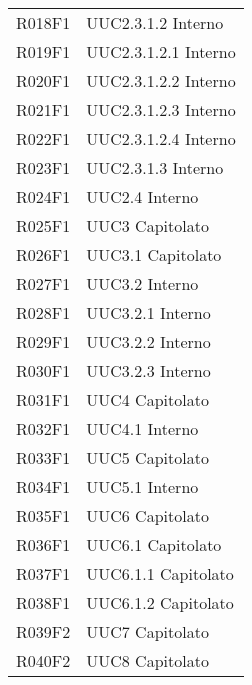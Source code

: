 \documentclass[../analisi-dei-requisiti.tex]{subfiles}
\begin{document}
\begin{longtable}[H]{ p{4cm} | p{4cm} }
  R018F1                               & UUC2.3.1.2 Interno            \\
  R019F1                               & UUC2.3.1.2.1 Interno          \\
  R020F1                               & UUC2.3.1.2.2 Interno          \\
  R021F1                               & UUC2.3.1.2.3 Interno          \\
  R022F1                               & UUC2.3.1.2.4 Interno          \\
  R023F1                               & UUC2.3.1.3 Interno            \\
  R024F1                               & UUC2.4 Interno                \\
  R025F1                               & UUC3 Capitolato               \\
  R026F1                               & UUC3.1 Capitolato             \\
  R027F1                               & UUC3.2 Interno                \\
  R028F1                               & UUC3.2.1 Interno              \\
  R029F1                               & UUC3.2.2 Interno              \\
  R030F1                               & UUC3.2.3 Interno              \\
  R031F1                               & UUC4 Capitolato               \\
  R032F1                               & UUC4.1 Interno                \\
  R033F1                               & UUC5 Capitolato               \\
  R034F1                               & UUC5.1 Interno                \\
  R035F1                               & UUC6 Capitolato               \\
  R036F1                               & UUC6.1 Capitolato             \\
  R037F1                               & UUC6.1.1 Capitolato           \\
  R038F1                               & UUC6.1.2 Capitolato           \\
  R039F2                               & UUC7 Capitolato               \\
  R040F2                               & UUC8 Capitolato               \\

\end{longtable}
\end{document}
